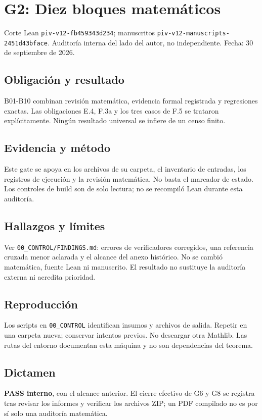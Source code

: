 \section{G2: Diez bloques
matemáticos}\label{g2-diez-bloques-matemuxe1ticos}

Corte Lean \texttt{piv-v12-fb459343d234}; manuscritos
\texttt{piv-v12-manuscripts-2451d43bface}. Auditoría interna del lado
del autor, no independiente. Fecha: 30 de septiembre de 2026.

\subsection{Obligación y resultado}\label{obligaciuxf3n-y-resultado}

B01-B10 combinan revisión matemática, evidencia formal registrada y
regresiones exactas. Las obligaciones E.4, F.3a y los tres casos de F.5
se trataron explícitamente. Ningún resultado universal se infiere de un
censo finito.

\subsection{Evidencia y método}\label{evidencia-y-muxe9todo}

Este gate se apoya en los archivos de su carpeta, el inventario de
entradas, los registros de ejecución y la revisión matemática. No basta
el marcador de estado. Los controles de build son de solo lectura; no se
recompiló Lean durante esta auditoría.

\subsection{Hallazgos y límites}\label{hallazgos-y-luxedmites}

Ver \texttt{00\_CONTROL/FINDINGS.md}: errores de verificadores
corregidos, una referencia cruzada menor aclarada y el alcance del anexo
histórico. No se cambió matemática, fuente Lean ni manuscrito. El
resultado no sustituye la auditoría externa ni acredita prioridad.

\subsection{Reproducción}\label{reproducciuxf3n}

Los scripts en \texttt{00\_CONTROL} identifican insumos y archivos de
salida. Repetir en una carpeta nueva; conservar intentos previos. No
descargar otra Mathlib. Las rutas del entorno documentan esta máquina y
no son dependencias del teorema.

\subsection{Dictamen}\label{dictamen}

\textbf{PASS interno}, con el alcance anterior. El cierre efectivo de G6
y G8 se registra tras revisar los informes y verificar los archivos ZIP;
un PDF compilado no es por sí solo una auditoría matemática.

